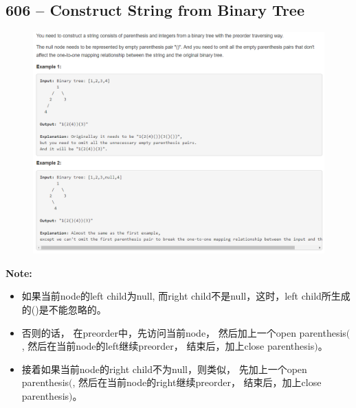\documentclass[a4paper,12pt]{article}
\begin{document}
\subsection{606 -- Construct String from Binary Tree}
\begin{figure}[H]
	\begin{center}
		\includegraphics[width=15cm]{606.png}
	\end{center}
\end{figure}
\textbf{\large{Note:}}
\par
\vspace{0.5em}
\noindent
\begin{CJK*}{UTF8}{gbsn}
	\begin{itemize}
		\item 如果当前node的left child为null, 而right child不是null，这时，left child所生成的()是不能忽略的。
		\item 否则的话， 在preorder中，先访问当前node， 然后加上一个open parenthesis$($, 然后在当前node的left继续preorder， 结束后，加上close parenthesis$)$。
		\item 接着如果当前node的right child不为null，则类似， 先加上一个open parenthesis$($, 然后在当前node的right继续preorder， 结束后，加上close parenthesis$)$。
	\end{itemize}
	\clearpage
\end{CJK*}
\end{document}
